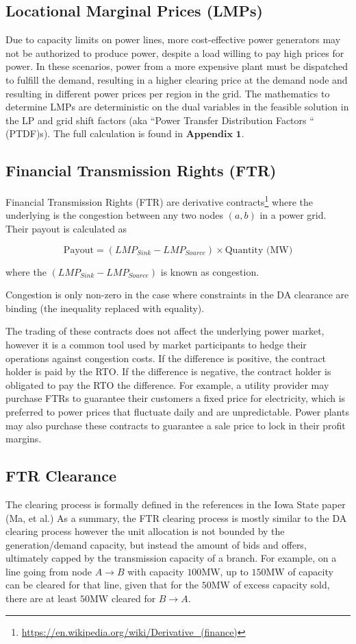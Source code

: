 \documentclass[11pt]{article}
\begin{document}
\subsection{Locational Marginal Prices (LMPs)}

Due to capacity limits on power lines, more cost-effective power generators may not be authorized to produce power, despite a load willing to pay high prices for power. In these scenarios, power from a more expensive plant must be dispatched to fulfill the demand, resulting in a higher clearing price at the demand node and resulting in different power prices per region in the grid. The mathematics to determine LMPs are deterministic on the dual variables in the feasible solution in the LP and grid shift factors (aka ``Power Transfer Distribution Factors
`` (PTDF)s). The full calculation is found in $\textbf{Appendix 1}$.

\subsection{Financial Transmission Rights (FTR)}

Financial Transmission Rights (FTR) are derivative contracts\footnote{\url{https://en.wikipedia.org/wiki/Derivative_(finance)}} where the underlying is the congestion between any two nodes $(a, b)$ in a power grid. Their payout is calculated as


$$\text{Payout} = (LMP_{Sink} - LMP_{Source}) \times \text{Quantity (MW)}$$

where the $(LMP_{Sink} - LMP_{Source})$ is known as congestion.

Congestion is only non-zero in the case where constraints in the DA clearance are binding (the inequality replaced with equality).

The trading of these contracts does not affect the underlying power market, however it is a common tool used by market participants to hedge their operations against congestion costs. If the difference is positive, the contract holder is paid by the RTO. If the difference is negative, the contract holder is obligated to pay the RTO the difference. For example, a utility provider may purchase FTRs to guarantee their customers a fixed price for electricity, which is preferred to power prices that fluctuate daily and are unpredictable. Power plants may also purchase these contracts to guarantee a sale price to lock in their profit margins.

\subsection{FTR Clearance}
The clearing process is formally defined in the references in the Iowa State paper (Ma, et al.) As a summary, the FTR clearing process is mostly similar to the DA clearing process however the unit allocation is not bounded by the generation/demand capacity, but instead the amount of bids and offers, ultimately capped by the transmission capacity of a branch. For example, on a line going from node $A \rightarrow B$ with capacity $100\text{MW}$, up to $150\text{MW}$ of capacity can be cleared for that line, given that for the $50\text{MW}$ of excess capacity sold, there are at least $50\text{MW}$ cleared for $B \rightarrow A$.
\end{document}
